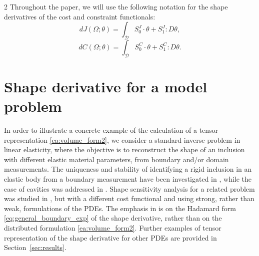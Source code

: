 \documentclass[a4paper, oneside]{article}
\newcommand{\VV}{\theta}
\begin{document}
\begin{multicols}{2}
Throughout the paper, we will use the following notation for the shape derivatives of the cost and constraint functionals:
	\begin{equation}\label{dJ1}
		dJ(\Omega;\VV) = \int_{\mathcal{D}} S_0^J \cdot \theta + S_1^J : D\theta, 
	\end{equation}
	\begin{equation}\label{dC1}
		dC(\Omega;\VV) = \int_{\mathcal{D}} S_0^C \cdot \theta + S_1^C : D\theta .
	\end{equation}

\section{Shape derivative for a model problem}\label{sec:model_prob}

In order to illustrate a concrete example of the calculation of a tensor representation \eqref{ea:volume_form2}, we consider a standard inverse problem in linear elasticity, where the objective is to reconstruct the shape of an inclusion with different elastic material parameters, from boundary and/or domain measurements.
The uniqueness and stability of identifying a rigid inclusion in an elastic body from a boundary measurement have been investigated in \cite{Morassi2009}, while the case of cavities was addressed in \cite{MR1772729}.
Shape sensitivity analysis for a related problem was studied in \cite{MEFTAHI20151554}, but with a different cost functional and using strong, rather than weak, formulations of the PDEs. The emphasis in \cite{MEFTAHI20151554} is on the Hadamard form \eqref{eq:general_boundary_exp} of the shape derivative, rather than on the distributed formulation \eqref{ea:volume_form2}.
Further examples of tensor representation of the shape derivative for other PDEs are provided in Section~\ref{sec:results}.


\end{multicols}
\end{document}
